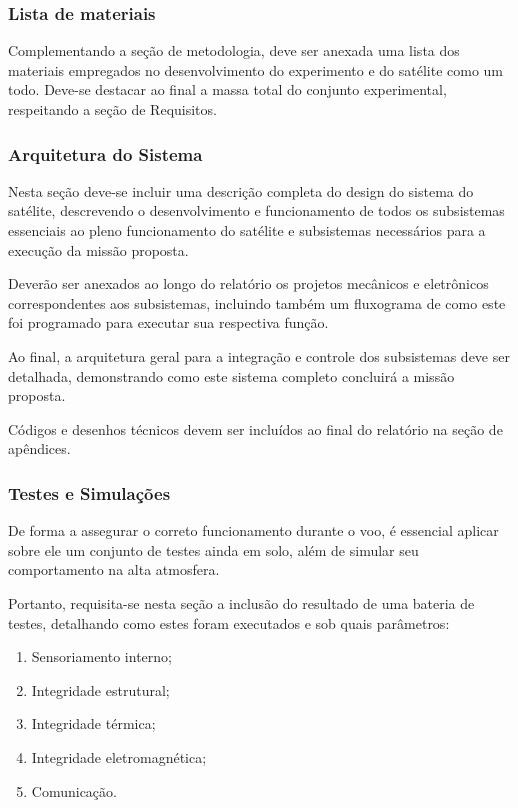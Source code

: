         \subsubsection{Lista de materiais}
            Complementando a seção de metodologia, deve ser anexada uma lista dos materiais empregados no desenvolvimento do experimento e do satélite como um todo. Deve-se destacar ao final a massa total do conjunto experimental, respeitando a seção de Requisitos.
        
        \subsubsection{Arquitetura do Sistema}
            Nesta seção deve-se incluir uma descrição completa do design do sistema do satélite, descrevendo o desenvolvimento e funcionamento de todos os subsistemas essenciais ao pleno funcionamento do satélite e subsistemas necessários para a execução da missão proposta.

            Deverão ser anexados ao longo do relatório os projetos mecânicos e eletrônicos correspondentes aos subsistemas, incluindo também um fluxograma de como este foi programado para executar sua respectiva função.
            
            Ao final, a arquitetura geral para a integração e controle dos subsistemas deve ser detalhada, demonstrando como este sistema completo concluirá a missão proposta.

            Códigos e desenhos técnicos devem ser incluídos ao final do relatório na seção de apêndices.
        
        \subsubsection{Testes e Simulações}
            De forma a assegurar o correto funcionamento durante o voo, é essencial aplicar sobre ele um conjunto de testes ainda em solo, além de simular seu comportamento na alta atmosfera.

            Portanto, requisita-se nesta seção a inclusão do resultado de uma bateria de testes, detalhando como estes foram executados e sob quais parâmetros:
            \begin{enumerate}
                \item Sensoriamento interno;
                \item Integridade estrutural;
                \item Integridade térmica;
                \item Integridade eletromagnética;
                \item Comunicação.
            \end{enumerate}

